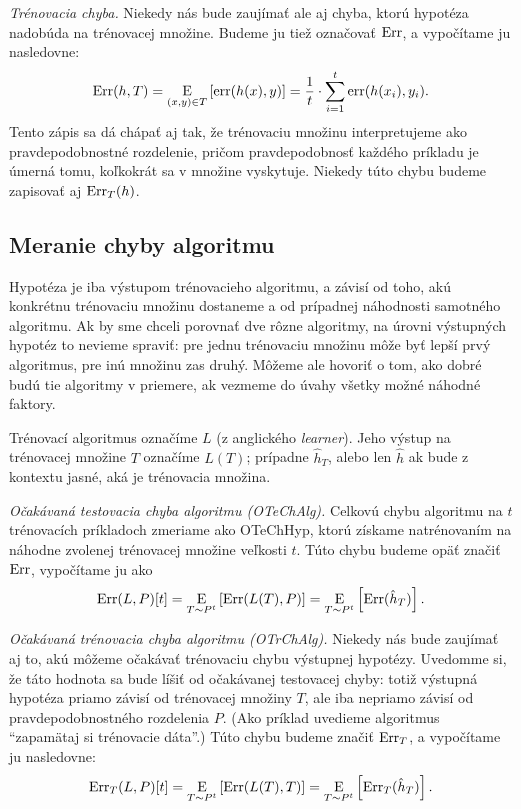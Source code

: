 \emph{Trénovacia chyba.} Niekedy nás bude zaujímať ale aj chyba,
ktorú hypotéza nadobúda na trénovacej množine. Budeme ju tiež
označovať $\mathrm{Err}$, a vypočítame ju nasledovne:
$$\mathrm{Err}(h, T) = \operatorname*{\mathrm{E}}_{(x, y) \in T} \left[ \mathrm{err}(h(x), y) \right] = \frac{1}{t} \cdot \sum_{i=1}^t \mathrm{err}(h(x_i), y_i).$$
Tento zápis sa dá chápať aj tak, že trénovaciu množinu interpretujeme
ako pravdepodobnostné rozdelenie, pričom pravdepodobnosť každého príkladu
je úmerná tomu, koľkokrát sa v množine vyskytuje. Niekedy túto chybu
budeme zapisovať aj $\mathrm{Err}_T(h)$.



\subsection{Meranie chyby algoritmu}

Hypotéza je iba výstupom trénovacieho algoritmu, a závisí od toho, akú
konkrétnu trénovaciu množinu dostaneme a od prípadnej náhodnosti
samotného algoritmu. Ak by sme chceli porovnať dve rôzne algoritmy,
na úrovni výstupných hypotéz to nevieme spraviť: pre jednu trénovaciu
množinu môže byť lepší prvý algoritmus, pre inú množinu zas druhý.
Môžeme ale hovoriť o tom, ako dobré budú tie algoritmy v priemere,
ak vezmeme do úvahy všetky možné náhodné faktory.

Trénovací algoritmus označíme $L$ (z anglického \emph{learner}). Jeho
výstup na trénovacej množine $T$ označíme $L(T)$; prípadne $\hat{h}_T$,
alebo len $\hat{h}$ ak bude z kontextu jasné, aká je trénovacia množina.

\emph{Očakávaná testovacia chyba algoritmu (OTeChAlg).} Celkovú chybu
algoritmu na $t$ trénovacích príkladoch zmeriame ako OTeChHyp, ktorú
získame natrénovaním na náhodne zvolenej trénovacej množine veľkosti $t$.
Túto chybu budeme opäť značiť $\mathrm{Err}$, vypočítame ju ako
$$\mathrm{Err}(L, P)[t] = \operatorname*{\mathrm{E}}_{T \sim P^t} \left[ \mathrm{Err}(L(T), P) \right] = \operatorname*{\mathrm{E}}_{T \sim P^t} \left[ \mathrm{Err}(\hat{h}_T) \right].$$

\emph{Očakávaná trénovacia chyba algoritmu (OTrChAlg).} Niekedy nás bude zaujímať aj to,
akú môžeme očakávať trénovaciu chybu výstupnej hypotézy. Uvedomme si,
že táto hodnota sa bude líšiť od očakávanej testovacej chyby: totiž
výstupná hypotéza priamo závisí od trénovacej množiny $T$, ale iba
nepriamo závisí od pravdepodobnostného rozdelenia $P$. (Ako príklad
uvedieme algoritmus ``zapamätaj si trénovacie dáta''.) Túto chybu
budeme značiť $\mathrm{Err}_T$, a vypočítame ju nasledovne:
$$\mathrm{Err}_T(L, P)[t] = \operatorname*{\mathrm{E}}_{T \sim P^t} \left[ \mathrm{Err}(L(T), T) \right] = \operatorname*{\mathrm{E}}_{T \sim P^t} \left[ \mathrm{Err}_T(\hat{h}_T) \right].$$

